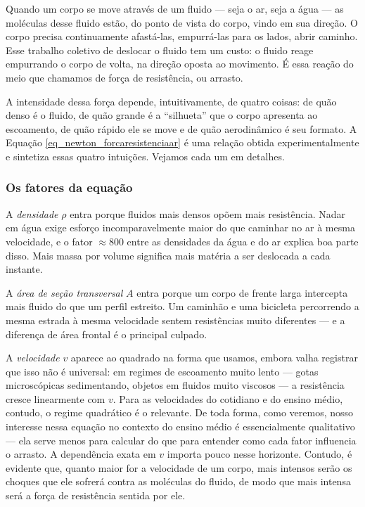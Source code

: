 

Quando um corpo se move através de um fluido --- seja o ar, seja a água --- as moléculas desse fluido estão, do ponto de vista do corpo, vindo em sua direção. O corpo precisa continuamente afastá-las, empurrá-las para os lados, abrir caminho. Esse trabalho coletivo de deslocar o fluido tem um custo: o fluido reage empurrando o corpo de volta, na direção oposta ao movimento. É essa reação do meio que chamamos de força de resistência, ou arrasto.

A intensidade dessa força depende, intuitivamente, de quatro coisas: de quão denso é o fluido, de quão grande é a ``silhueta'' que o corpo apresenta ao escoamento, de quão rápido ele se move e de quão aerodinâmico é  seu formato. A Equação \eqref{eq_newton_forcaresistenciaar} é uma relação obtida experimentalmente e sintetiza essas quatro intuições. Vejamos cada um em detalhes.

\subsubsection*{Os fatores da equação}

A \textit{densidade} $\rho$ entra porque fluidos mais densos opõem mais resistência. Nadar em água exige esforço incomparavelmente maior do que caminhar no ar à mesma velocidade, e o fator $\approx 800$ entre as densidades da água e do ar explica boa parte disso. Mais massa por volume significa mais matéria a ser deslocada a cada instante.

A \textit{área de seção transversal} $A$ entra porque um corpo de frente larga intercepta mais fluido do que um perfil estreito. Um caminhão e uma bicicleta percorrendo a mesma estrada à mesma velocidade sentem resistências muito diferentes --- e a diferença de área frontal é o principal culpado.

A \textit{velocidade} $v$ aparece ao quadrado na forma que usamos, embora valha registrar que isso não é universal: em regimes de escoamento muito lento --- gotas microscópicas sedimentando, objetos em fluidos muito viscosos --- a resistência cresce linearmente com $v$. Para as velocidades do cotidiano e do ensino médio, contudo, o regime quadrático é o relevante. De toda forma, como veremos, nosso interesse nessa equação no contexto do ensino médio é essencialmente qualitativo --- ela serve menos para calcular do que para entender como cada fator influencia o arrasto. A dependência exata em $v$ importa pouco nesse horizonte. Contudo, é evidente que, quanto maior for a velocidade de um corpo, mais intensos serão os choques que ele sofrerá contra as moléculas do fluido, de modo que mais intensa será a força de resistência sentida por ele.

